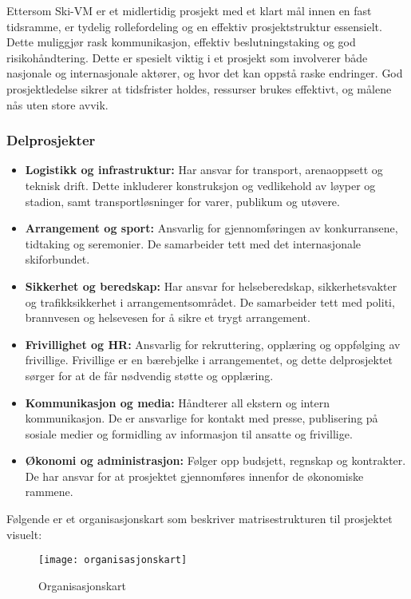 Ettersom Ski-VM er et midlertidig prosjekt med et klart mål innen en fast tidsramme, er tydelig rollefordeling og en effektiv prosjektstruktur essensielt. Dette muliggjør rask kommunikasjon, effektiv beslutningstaking og god risikohåndtering. Dette er spesielt viktig i et prosjekt som involverer både nasjonale og internasjonale aktører, og hvor det kan oppstå raske endringer. God prosjektledelse sikrer at tidsfrister holdes, ressurser brukes effektivt, og målene nås uten store avvik.

\subsubsection*{Delprosjekter}

\begin{itemize}
    \item \textbf{Logistikk og infrastruktur:} Har ansvar for transport, arenaoppsett og teknisk drift. Dette inkluderer konstruksjon og vedlikehold av løyper og stadion, samt transportløsninger for varer, publikum og utøvere.
    
    \item \textbf{Arrangement og sport:} Ansvarlig for gjennomføringen av konkurransene, tidtaking og seremonier. De samarbeider tett med det internasjonale skiforbundet.
    
    \item \textbf{Sikkerhet og beredskap:} Har ansvar for helseberedskap, sikkerhetsvakter og trafikksikkerhet i arrangementsområdet. De samarbeider tett med politi, brannvesen og helsevesen for å sikre et trygt arrangement.
    
    \item \textbf{Frivillighet og HR:} Ansvarlig for rekruttering, opplæring og oppfølging av frivillige. Frivillige er en bærebjelke i arrangementet, og dette delprosjektet sørger for at de får nødvendig støtte og opplæring.
    
    \item \textbf{Kommunikasjon og media:} Håndterer all ekstern og intern kommunikasjon. De er ansvarlige for kontakt med presse, publisering på sosiale medier og formidling av informasjon til ansatte og frivillige.
    
    \item \textbf{Økonomi og administrasjon:} Følger opp budsjett, regnskap og kontrakter. De har ansvar for at prosjektet gjennomføres innenfor de økonomiske rammene.
\end{itemize}
Følgende er et organisasjonskart som beskriver matrisestrukturen til prosjektet visuelt:
\begin{figure}[H]
    \centering
    \texttt{[image: organisasjonskart]}
    \caption{Organisasjonskart}
    \label{fig:organisasjonskart}
\end{figure}